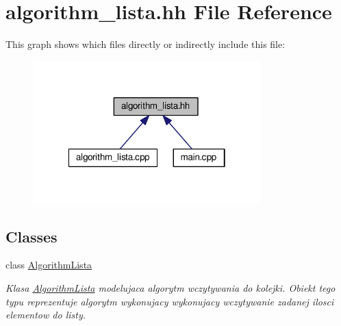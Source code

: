 \hypertarget{algorithm__lista_8hh}{}\section{algorithm\+\_\+lista.\+hh File Reference}
\label{algorithm__lista_8hh}
This graph shows which files directly or indirectly include this file\+:\nopagebreak
\begin{figure}[H]
\begin{center}
\leavevmode
\includegraphics[width=250pt]{algorithm__lista_8hh__dep__incl}
\end{center}
\end{figure}
\subsection*{Classes}
\begin{DoxyCompactItemize}
\item 
class \hyperlink{class_algorithm_lista}{Algorithm\+Lista}
\begin{DoxyCompactList}\small\item\em Klasa \hyperlink{class_algorithm_lista}{Algorithm\+Lista} modelujaca algorytm wczytywania do kolejki. Obiekt tego typu reprezentuje algorytm wykonujacy wykonujacy wczytywanie zadanej ilosci elementow do listy. \end{DoxyCompactList}\end{DoxyCompactItemize}
